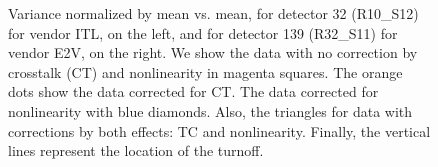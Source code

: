 \begin{figure}[!htb]
\begin{subfigure}[b]{0.49\textwidth}
     \end{subfigure}
        \caption{Variance normalized by mean vs. mean, for detector 32 (R10\_S12) for vendor ITL, on the left, and for detector 139 (R32\_S11) for vendor E2V, on the right. We show the data with no correction by crosstalk (CT) and nonlinearity in magenta squares. The orange dots show the data corrected for CT. The data corrected for nonlinearity with blue diamonds. Also, the triangles for data with corrections by both effects: TC and nonlinearity. Finally, the vertical lines represent the location of the turnoff.}
        
        \label{fig:varmean_crosstalk}
\end{figure}


\cite{scipy_2020}